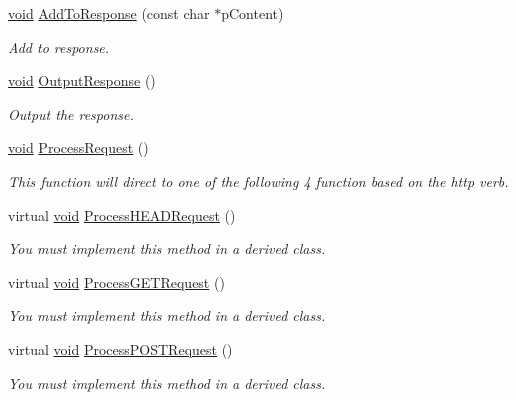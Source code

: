 \begin{DoxyCompactItemize}
\hyperlink{_cpclient_8h_a6464f7480a0fd0ee170cba12b2c0497f}{void} \hyperlink{class_c_g_i_c_plus_plus_afe65eb134d2a50350cd84aa5dbf93a77}{\-Add\-To\-Response} (const char $\ast$p\-Content)
\begin{DoxyCompactList}\small\item\em \-Add to response. \end{DoxyCompactList}\item 
\hyperlink{_cpclient_8h_a6464f7480a0fd0ee170cba12b2c0497f}{void} \hyperlink{class_c_g_i_c_plus_plus_aa4d752cb80937e653cdea73ee7761d6d}{\-Output\-Response} ()
\begin{DoxyCompactList}\small\item\em \-Output the response. \end{DoxyCompactList}\item 
\hyperlink{_cpclient_8h_a6464f7480a0fd0ee170cba12b2c0497f}{void} \hyperlink{class_c_g_i_c_plus_plus_a526b66e47624baadbf21e43004907256}{\-Process\-Request} ()
\begin{DoxyCompactList}\small\item\em \-This function will direct to one of the following 4 function based on the http verb. \end{DoxyCompactList}\item 
virtual \hyperlink{_cpclient_8h_a6464f7480a0fd0ee170cba12b2c0497f}{void} \hyperlink{class_c_g_i_c_plus_plus_a9769c9cb4d5d9245257816ff39891764}{\-Process\-H\-E\-A\-D\-Request} ()
\begin{DoxyCompactList}\small\item\em \-You must implement this method in a derived class. \end{DoxyCompactList}\item 
virtual \hyperlink{_cpclient_8h_a6464f7480a0fd0ee170cba12b2c0497f}{void} \hyperlink{class_c_g_i_c_plus_plus_a378fb441bed59d816017d7e1ea6296f2}{\-Process\-G\-E\-T\-Request} ()
\begin{DoxyCompactList}\small\item\em \-You must implement this method in a derived class. \end{DoxyCompactList}\item 
virtual \hyperlink{_cpclient_8h_a6464f7480a0fd0ee170cba12b2c0497f}{void} \hyperlink{class_c_g_i_c_plus_plus_a2f2776ae8909abdf3769c84415d64952}{\-Process\-P\-O\-S\-T\-Request} ()
\begin{DoxyCompactList}\small\item\em \-You must implement this method in a derived class. \end{DoxyCompactList}\item 

\end{DoxyCompactItemize}

